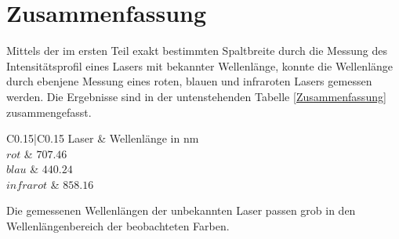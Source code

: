 %

 

\section{Zusammenfassung}

Mittels der im ersten Teil exakt bestimmten Spaltbreite durch die Messung des Intensitätsprofil eines Lasers mit bekannter Wellenlänge, konnte die Wellenlänge durch ebenjene Messung eines roten, blauen und infraroten Lasers gemessen werden. Die Ergebnisse sind  in der untenstehenden Tabelle \ref{Zusammenfassung} zusammengefasst.


\begin{table}[H]
\centering
\label{Zusammenfassung}
	\caption{Zusammenfassung der ermittelten Wellenlängen der unbekannten Laser }
	\begin{tabular}{C{0.15\linewidth}|C{0.15\linewidth}}
		Laser & Wellenlänge in nm\\
		\hline \addlinespace[1ex] 
		$ rot $ & $707.46$\\
		$ blau $ & $440.24$\\
		$ infrarot $ & $858.16$\\
	\end{tabular}
\end{table}

Die gemessenen Wellenlängen der unbekannten Laser passen grob in den Wellenlängenbereich der beobachteten Farben.

%


